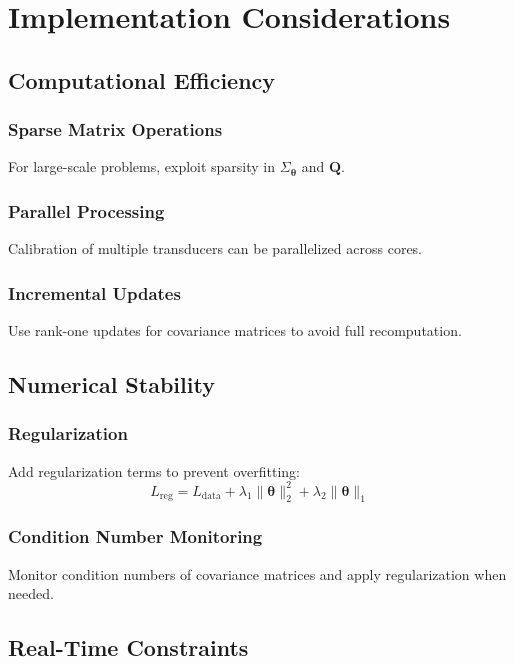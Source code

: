 \documentclass[11pt]{article}
\begin{document}
\section{Implementation Considerations}

\subsection{Computational Efficiency}

\subsubsection{Sparse Matrix Operations}
For large-scale problems, exploit sparsity in $\Sigma_{\bm{\theta}}$ and $\mathbf{Q}$.

\subsubsection{Parallel Processing}
Calibration of multiple transducers can be parallelized across cores.

\subsubsection{Incremental Updates}
Use rank-one updates for covariance matrices to avoid full recomputation.

\subsection{Numerical Stability}

\subsubsection{Regularization}
Add regularization terms to prevent overfitting:
\begin{equation}
L_{\text{reg}} = L_{\text{data}} + \lambda_1 \|\bm{\theta}\|_2^2 + \lambda_2 \|\bm{\theta}\|_1
\end{equation}

\subsubsection{Condition Number Monitoring}
Monitor condition numbers of covariance matrices and apply regularization when needed.

\subsection{Real-Time Constraints}
\end{document}
